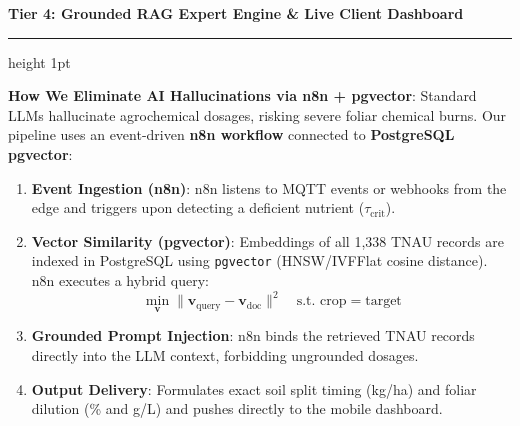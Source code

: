 \documentclass[11pt,a4paper,landscape]{article}
\begin{document}
\newpage
\begin{center}
    {\Large \textbf{\color{primary} Tier 4: Grounded RAG Expert Engine \& Live Client Dashboard}}
\end{center}
\vspace{0.2cm}
\hrule height 1pt \color{primary}
\vspace{0.4cm}

\begin{minipage}[t]{0.48\textwidth}
\begin{tcolorbox}[colback=white,colframe=primary,title=\textbf{n8n Workflow \& pgvector Retrieval Architecture},arc=2mm]
\textbf{How We Eliminate AI Hallucinations via n8n + pgvector}:
Standard LLMs hallucinate agrochemical dosages, risking severe foliar chemical burns. Our pipeline uses an event-driven \textbf{n8n workflow} connected to \textbf{PostgreSQL pgvector}:
\begin{enumerate}[leftmargin=*]
    \item \textbf{Event Ingestion (n8n)}: n8n listens to MQTT events or webhooks from the edge and triggers upon detecting a deficient nutrient ($\tau_{\text{crit}}$).
    \item \textbf{Vector Similarity (pgvector)}: Embeddings of all 1,338 TNAU records are indexed in PostgreSQL using \texttt{pgvector} (HNSW/IVFFlat cosine distance). n8n executes a hybrid query:
    \begin{equation*}
        \min_{\mathbf{v}} \|\mathbf{v}_{\text{query}} - \mathbf{v}_{\text{doc}}\|^2 \quad \text{s.t. } \text{crop} = \text{target}
    \end{equation*}
    \item \textbf{Grounded Prompt Injection}: n8n binds the retrieved TNAU records directly into the LLM context, forbidding ungrounded dosages.
    \item \textbf{Output Delivery}: Formulates exact soil split timing (kg/ha) and foliar dilution (\% and g/L) and pushes directly to the mobile dashboard.
\end{enumerate}
\end{tcolorbox}
\end{minipage}
\hfill
\end{document}

